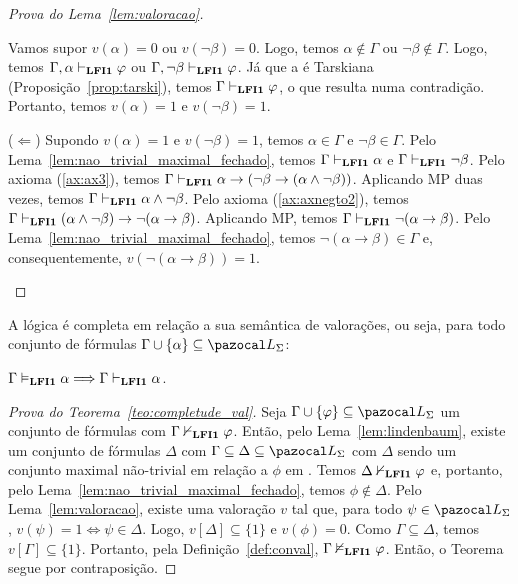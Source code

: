 \begin{proof}[Prova do Lema~\ref{lem:valoracao}]
\begin{provaporcasos}
\begin{adjustwidth}{1cm}{}
                            \noindent Vamos supor $v(\alpha) = 0$ ou $v(\neg \beta) = 0$. Logo, temos $\alpha \not \in \Gamma$ ou $\neg \beta \not \in \Gamma$. Logo, temos $\Gamma, \alpha \vdash_{{\normalfont\textbf{LFI1}}{}} \varphi$ ou $\Gamma, \neg \beta \vdash_{{\normalfont\textbf{LFI1}}{}} \varphi$. Já que a \lfium{} é Tarskiana (Proposição~\ref{prop:tarski}), temos $\Gamma \vdash_{{\normalfont\textbf{LFI1}}{}} \varphi$, o que resulta numa contradição. Portanto, temos $v(\alpha) = 1$ e $v(\neg \beta) = 1$.

                            \noindent ($\Longleftarrow$) Supondo $v(\alpha) = 1$ e $v(\neg \beta) = 1$, temos $\alpha \in \Gamma$ e $\neg \beta \in \Gamma$. Pelo Lema~\ref{lem:nao_trivial_maximal_fechado}, temos $\Gamma \vdash_{{\normalfont\textbf{LFI1}}{}} \alpha$ e $\Gamma \vdash_{{\normalfont\textbf{LFI1}}{}} \neg \beta$. Pelo axioma (\ref{ax:ax3}), temos $\Gamma \vdash_{{\normalfont\textbf{LFI1}}{}} \alpha \to (\neg \beta \to (\alpha \land \neg \beta))$. Aplicando MP duas vezes, temos $\Gamma \vdash_{{\normalfont\textbf{LFI1}}{}} \alpha \land \neg \beta$. Pelo axioma (\ref{ax:axnegto2}), temos $\Gamma \vdash_{{\normalfont\textbf{LFI1}}{}} (\alpha \land \neg \beta) \to \neg (\alpha \to \beta)$. Aplicando MP, temos $\Gamma \vdash_{{\normalfont\textbf{LFI1}}{}} \neg (\alpha \to \beta)$. Pelo Lema~\ref{lem:nao_trivial_maximal_fechado}, temos $\neg (\alpha \to \beta) \in \Gamma$ e, consequentemente, $v(\neg (\alpha \to \beta)) = 1$. \qedhere


                        \end{adjustwidth}

            \end{provaporcasos}


        \end{proof}
        

        \begin{teorema}\label{teo:completude_val}
            A lógica {\normalfont\lfium{}} é completa em relação a sua semântica de valorações, ou seja, para todo conjunto de fórmulas $\Gamma \cup \{\alpha\} \subseteq \ling{}$:

            \centering
            {\normalfont{} $\Gamma \vDash_{{\normalfont\textbf{LFI1}}{}} \alpha \Longrightarrow \Gamma \vdash_{{\normalfont\textbf{LFI1}}{}} \alpha$.}
        \end{teorema}

        \begin{proof}[Prova do Teorema~\ref{teo:completude_val}]
            Seja $\Gamma \cup \{\phi\} \subseteq \ling{}$ um conjunto de fórmulas com $\Gamma \nvdash_{{\normalfont\textbf{LFI1}}{}} \varphi$. Então, pelo Lema~\ref{lem:lindenbaum}, existe um conjunto de fórmulas $\Delta$ com $\Gamma \subseteq \Delta \subseteq \ling{}$ com $\Delta$ sendo um conjunto maximal não-trivial em relação a $\phi$ em \lfium{}. Temos $\Delta \nvdash_{{\normalfont\textbf{LFI1}}{}} \varphi$ e, portanto, pelo Lema~\ref{lem:nao_trivial_maximal_fechado}, temos $\phi \not \in \Delta$. Pelo Lema~\ref{lem:valoracao}, existe uma valoração $v$ tal que, para todo $\psi \in \ling{}$, $v(\psi) = 1 \Longleftrightarrow \psi \in \Delta$. Logo, $v[\Delta] \subseteq \{1\}$ e $v(\phi) = 0$. Como $\Gamma \subseteq \Delta$, temos $v[\Gamma] \subseteq \{1\}$. Portanto, pela Definição~\ref{def:conval}, $\Gamma \nvDash_{{\normalfont\textbf{LFI1}}{}} \varphi$. Então, o Teorema segue por contraposição. \qedhere

        \end{proof}

